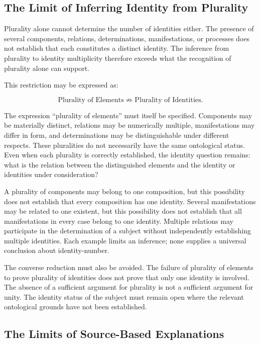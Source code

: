 \subsection{The Limit of Inferring Identity from Plurality}

Plurality alone cannot determine the number of
identities either. The presence of several components,
relations, determinations, manifestations, or processes
does not establish that each constitutes a distinct
identity. The inference from plurality to identity
multiplicity therefore exceeds what the recognition
of plurality alone can support.

This restriction may be expressed as:

\[
\text{Plurality of Elements}
\not\Rightarrow
\text{Plurality of Identities}.
\]

The expression ``plurality of elements'' must itself
be specified. Components may be materially distinct,
relations may be numerically multiple, manifestations
may differ in form, and determinations may be
distinguishable under different respects. These
pluralities do not necessarily have the same
ontological status. Even when each plurality is
correctly established, the identity question remains:
what is the relation between the distinguished
elements and the identity or identities under
consideration?

A plurality of components may belong to one
composition, but this possibility does not establish
that every composition has one identity. Several
manifestations may be related to one existent, but
this possibility does not establish that all
manifestations in every case belong to one identity.
Multiple relations may participate in the determination
of a subject without independently establishing
multiple identities. Each example limits an inference;
none supplies a universal conclusion about identity-number.

The converse reduction must also be avoided. The
failure of plurality of elements to prove plurality
of identities does not prove that only one identity
is involved. The absence of a sufficient argument
for plurality is not a sufficient argument for unity.
The identity status of the subject must remain open
where the relevant ontological grounds have not
been established.

\subsection{The Limits of Source-Based Explanations}

